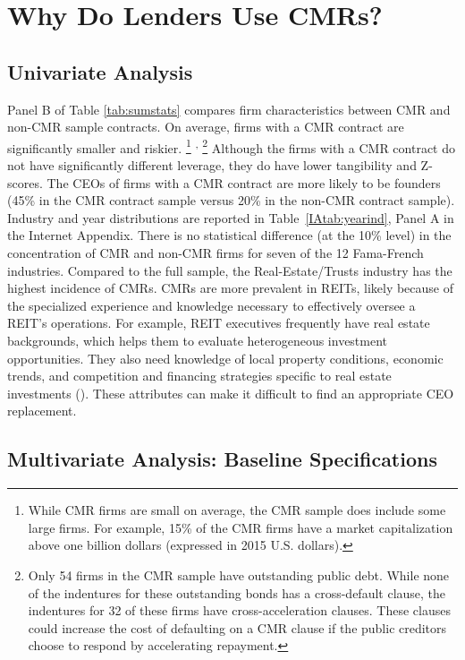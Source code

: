 \documentclass[a4paper,12pt]{article}
\begin{document}
\section{Why Do Lenders Use CMRs? }
\label{section:inclusion}


\subsection{Univariate Analysis}
\label{section:inclusion_univariate}

Panel B of Table \ref{tab:sumstats} compares firm characteristics between CMR and non-CMR sample contracts.
On average, firms with a CMR contract are significantly smaller and riskier.%
  \footnote{While CMR firms are small on average, the CMR sample does include some large firms. For example, 15\% of the CMR firms have a market capitalization above one billion dollars (expressed in 2015 U.S. dollars).}%
  \textsuperscript{,}%
  \footnote{Only 54 firms in the CMR sample have outstanding public debt. While none of the indentures for these outstanding bonds has a cross-default clause, the indentures for 32 of these firms have cross-acceleration clauses. These clauses could increase the cost of defaulting on a CMR clause if the public creditors choose to respond by accelerating repayment.}
Although the firms with a CMR contract do not have significantly different leverage, they do have lower tangibility and Z-scores.
The CEOs of firms with a CMR contract are more likely to be founders (45\% in the CMR contract sample versus 20\% in the non-CMR contract sample).
Industry and year distributions are reported in Table~\ref{IAtab:yearind}, Panel A in the Internet Appendix.
There is no statistical difference (at the 10\% level) in the concentration of CMR and non-CMR firms for seven of the 12 Fama-French industries.
Compared to the full sample, the Real-Estate/Trusts industry has the highest incidence of CMRs.
CMRs are more prevalent in REITs, likely because of the specialized experience and knowledge necessary to effectively oversee a REIT's operations.
For example, REIT executives frequently have real estate backgrounds, which helps them to evaluate heterogeneous investment opportunities.
They also need knowledge of local property conditions, economic trends, and competition and financing strategies specific to real estate investments (\citet{Han_2006}).
These attributes can make it difficult to find an appropriate CEO replacement.



\subsection{Multivariate Analysis: Baseline Specifications}
\label{section:inclusion_baseprobit}
\end{document}
